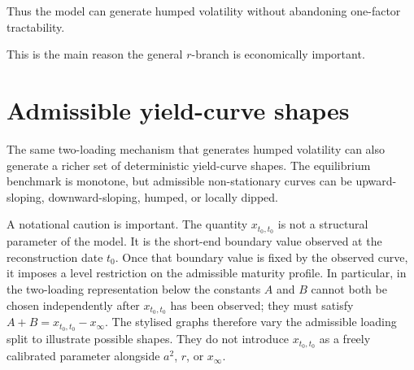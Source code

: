 \documentclass[11pt]{article}
\theoremstyle{plainbreak}
\begin{document}
Thus the model can generate humped volatility without abandoning one-factor tractability.

This is the main reason the general \(r\)-branch is economically important.


\section{Admissible yield-curve shapes}

The same two-loading mechanism that generates humped volatility can also generate a richer set of deterministic yield-curve shapes. The equilibrium benchmark is monotone, but admissible non-stationary curves can be upward-sloping, downward-sloping, humped, or locally dipped.

A notational caution is important. The quantity \(x_{t_0,t_0}\) is not a structural parameter of the model. It is the short-end boundary value observed at the reconstruction date \(t_0\). Once that boundary value is fixed by the observed curve, it imposes a level restriction on the admissible maturity profile. In particular, in the two-loading representation below the constants \(A\) and \(B\) cannot both be chosen independently after \(x_{t_0,t_0}\) has been observed; they must satisfy \(A+B=x_{t_0,t_0}-x_\infty\). The stylised graphs therefore vary the admissible loading split to illustrate possible shapes. They do not introduce \(x_{t_0,t_0}\) as a freely calibrated parameter alongside \(a^2\), \(r\), or \(x_\infty\).
\end{document}
